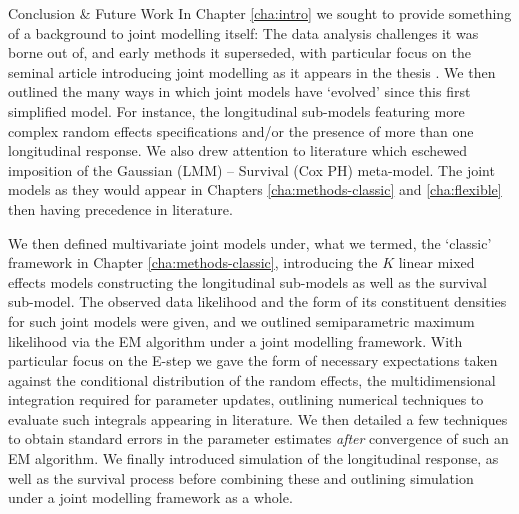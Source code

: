 \begin{chapter}{\label{cha:conclusion}Conclusion \& Future Work}
In Chapter \ref{cha:intro} we sought to provide something of a background to joint modelling itself: The data analysis challenges it was borne out of, and early methods it superseded, with particular focus on the seminal article introducing joint modelling as it appears in the thesis \citep{Wulfsohn97}. We then outlined the many ways in which joint models have `evolved' since this first simplified model. For instance, the longitudinal sub-models featuring more complex random effects specifications and/or the presence of more than one longitudinal response. We also drew attention to literature which eschewed imposition of the Gaussian (\ie LMM) -- Survival (\ie Cox PH) meta-model. The joint models as they would appear in Chapters \ref{cha:methods-classic} and \ref{cha:flexible} then having precedence in literature. 

We then defined multivariate joint models under, what we termed, the `classic' framework in Chapter \ref{cha:methods-classic}, introducing the $K$ linear mixed effects models constructing the longitudinal sub-models as well as the survival sub-model. The observed data likelihood and the form of its constituent densities for such joint models were given, and we outlined semiparametric maximum likelihood via the EM algorithm under a joint modelling framework. With particular focus on the E-step we gave the form of necessary expectations taken against the conditional distribution of the random effects, \ie the multidimensional integration required for parameter updates, outlining numerical techniques to evaluate such integrals appearing in literature. We then detailed a few techniques to obtain standard errors in the parameter estimates \textit{after} convergence of such an EM algorithm. We finally introduced simulation of the longitudinal response, as well as the survival process before combining these and outlining simulation under a joint modelling framework as a whole.


\end{chapter}
